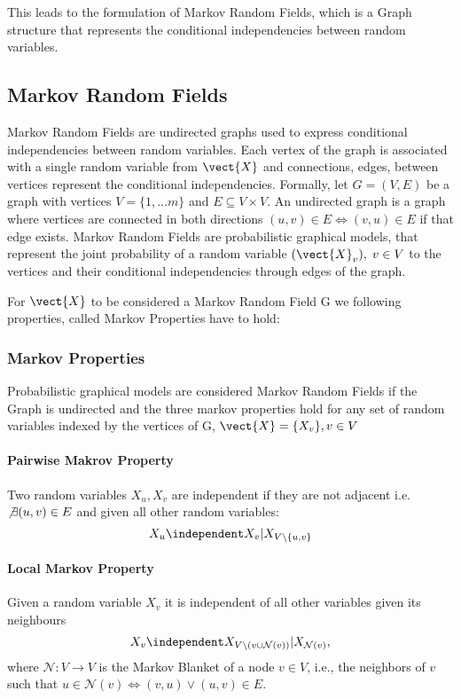 This leads to the formulation of Markov Random Fields, which is a Graph structure that represents the conditional independencies between random variables.

\subsection{Markov Random Fields}
Markov Random Fields are undirected graphs used to express conditional independencies between random variables. 
Each vertex of the graph is associated with a single random variable from $\vect{X}$ and connections, edges, between vertices represent the conditional independencies. 
Formally, let $G = (V,E)$ be a graph with vertices $V=\{1, \ldots m\}$ and $E \subseteq V \times V$. An undirected graph is a graph where vertices are connected in both directions $(u,v) \in E \Leftrightarrow (v,u) \in E$ if that edge exists.
Markov Random Fields are probabilistic graphical models, that represent the joint probability of a random variable $(\vect{X}_v), \; v \in V$ \wrt to the vertices and their conditional independencies through edges of the graph. 

For $\vect{X}$ to be considered a Markov Random Field \wrt G we following properties, called Markov Properties have to hold:

\subsubsection*{Markov Properties}
Probabilistic graphical models are considered Markov Random Fields if the Graph is undirected and the three markov properties hold for any set of random variables indexed by the vertices of G, $\vect{X} = \{X_v\}, v \in V$

\paragraph*{Pairwise Makrov Property}
Two random variables $X_u, X_v$ are independent if they are not adjacent i.e. $\not\exists (u,v) \in E$ and given all other random variables:
\begin{equation}
    X_u \independent X_v \lvert X_{V \setminus\{u,v\}}
\end{equation}

\paragraph*{Local Markov Property}
Given a random variable $X_v$ it is independent of all other variables given its neighbours 
\begin{equation}
    X_v \independent X_{V\setminus (v \cup \mathcal{N}(v))} \lvert X_{\mathcal{N}(v)},   
\end{equation}
where $\mathcal{N}: V \rightarrow V$ is the Markov Blanket of a node $v \in V$, i.e., the neighbors of $v$ such that $u \in \mathcal{N}(v) \Leftrightarrow (v,u) \vee (u,v) \in E$.

